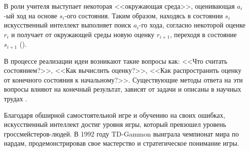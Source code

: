 В роли учителя выступает некоторая <<окружающая среда>>, оценивающая $a_i$-ый ход на основе $s_i$-ого состояния. Таким образом, находясь в состоянии $s_i$ искусственный интеллект выполняет поиск $a_i$-го хода, согласно некоторой оценке $r_i$ и получает от окружающей среды новую оценку $r_{i + 1}$, переходя в состояние $s_{i + 1}$ ().


В процессе реализации идеи возникают такие вопросы как: <<Что считать состоянием?>>, <<Как вычислить оценку?>>, <<Как распространить оценку от конечного состояния к начальному?>>. Существующие методы ответа на эти вопросы влияют на конечный результат, зависят от задачи и описаны в научных трудах \cite{tdlearn}.

Благодаря обширной самостоятельной игре и обучению на своих ошибках, искусственный интеллект достиг уровня игры, который превзошел уровень гроссмейстеров-людей. В 1992 году TD-Gammon выиграла чемпионат мира по нардам, продемонстрировав свое мастерство и стратегическое понимание игры.
